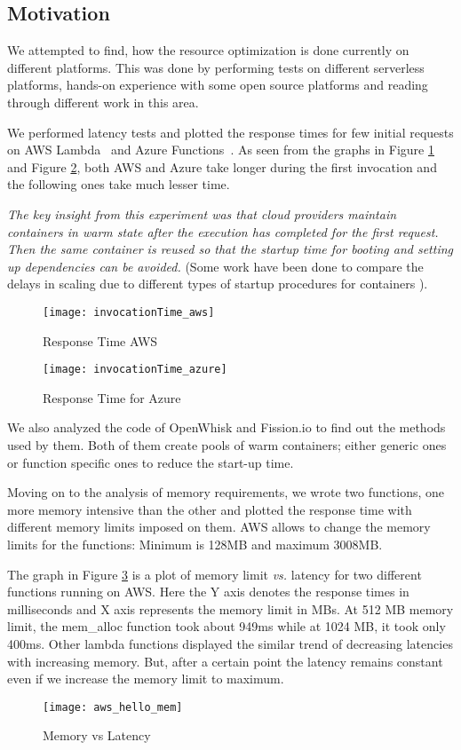 \documentclass[letterpaper,twocolumn,10pt]{article}
\begin{document}
\subsection{Motivation}

We attempted to find, how the resource optimization is done currently on different platforms. This was done by performing tests on different serverless platforms, hands-on experience with some open source platforms and reading through different work in this area.

We performed latency tests and plotted the response times for few initial requests on AWS Lambda~\cite{aws} and Azure Functions~\cite{azure}. As seen from the graphs in Figure \ref{fig:Figure1} and  Figure \ref{fig:Figure2}, both AWS and Azure take longer during the first invocation and the following ones take much lesser time. 

{\it The key insight from this experiment was that cloud providers maintain containers in warm state after the execution has completed for the first request. Then the same container is reused so that the startup time for booting and setting up dependencies can be avoided.} (Some work have been done to compare the delays in scaling due to different types of startup procedures for containers \cite{scalecon}).

\begin{figure}[H]
\texttt{[image: invocationTime\_aws]}
    \caption{Response Time AWS}
    \label{fig:Figure1}
\end{figure}
\begin{figure}[H]
\texttt{[image: invocationTime\_azure]}
    \caption{Response Time for Azure}
    \label{fig:Figure2}
    \end{figure}
    
We also analyzed the code of OpenWhisk\cite{whisk} and Fission.io\cite{fission} to find out the methods used by them. Both of them create pools of warm containers; either generic ones or function specific ones to reduce the start-up time.

Moving on to the analysis of memory requirements, we wrote two functions, one more memory intensive than the other and plotted the response time with different memory limits imposed on them. AWS allows to change the memory limits for the functions: Minimum is 128MB and maximum 3008MB.

The graph in Figure \ref{fig:Figure3} is a plot of memory limit \textit{vs.} latency for two different functions running on AWS. Here the Y axis denotes the response times in milliseconds and X axis represents the memory limit in MBs. At 512 MB memory limit, the mem\_alloc function took about 949ms while at 1024 MB, it took only 400ms. Other lambda functions displayed the similar trend of decreasing latencies with increasing memory. But, after a certain point the latency remains constant even if we increase the memory limit to maximum. 
\begin{figure}[H]
\texttt{[image: aws\_hello\_mem]}
    \caption{Memory vs Latency}
    \label{fig:Figure3}
    \end{figure}
\end{document}
